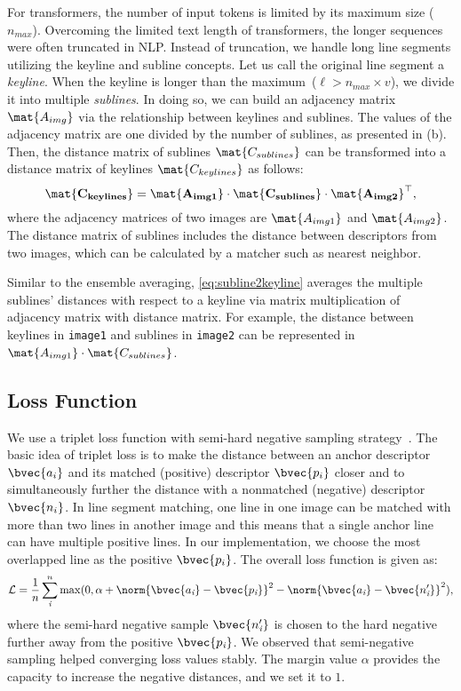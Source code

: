 \documentclass[letterpaper, 10 pt, journal, twoside]{ieeetran}
\begin{document}
For transformers, the number of input tokens is limited by its maximum size ($n_{max}$). Overcoming the limited text length of transformers, the longer sequences were often truncated in NLP.
Instead of truncation, we handle long line segments utilizing the keyline and subline concepts. Let us call the original line segment a \textit{keyline}. When the keyline is longer than the maximum~($\ell > n_{max} \times v$), we divide it into multiple \textit{sublines}. In doing so, we can build an adjacency matrix~$\mat{A_{img}}$ via the relationship between keylines and sublines. The values of the adjacency matrix are one divided by the number of sublines, as presented in (b). Then, the distance matrix of sublines $\mat{C_{sublines}}$ can be transformed into a distance matrix of keylines $\mat{C_{keylines}}$ as follows:
\begin{equation*}
  \label{eq:subline2keyline}
  \mathbf{\mat{C_{keylines}} = \mat{A_{img1}} \cdot \mat{C_{sublines}} \cdot \mat{A_{img2}}^\top},
\end{equation*}
where the adjacency matrices of two images are $\mat{A_{img1}}$ and $\mat{A_{img2}}$. The distance matrix of sublines includes the distance between descriptors from two images, which can be calculated by a matcher such as nearest neighbor.

Similar to the ensemble averaging, \eqref{eq:subline2keyline} averages the multiple sublines' distances with respect to a keyline via matrix multiplication of adjacency matrix with distance matrix. For example, the distance between keylines in \texttt{image1} and sublines in \texttt{image2} can be represented in $\mat{A_{img1}} \cdot \mat{C_{sublines}}$.


\subsection{Loss Function}

We use a triplet loss function with semi-hard negative sampling strategy~\cite{Schroff2015}. The basic idea of triplet loss is to make the distance between an anchor descriptor $\bvec{a_i}$ and its matched (positive) descriptor $\bvec{p_i}$ closer and to simultaneously further the distance with a nonmatched (negative) descriptor $\bvec{n_i}$. In line segment matching, one line in one image can be matched with more than two lines in another image and this means that a single anchor line can have multiple positive lines. In our implementation, we choose the most overlapped line as the positive $\bvec{p_i}$. The overall loss function is given as:
\begin{equation}
	\label{eq:triplet_loss}
	\mathcal{L} = \frac{1}{n}\sum_{\textit{i}}^{n}\max(0, \alpha + \norm{\bvec{a_{\textit{i}}} - \bvec{p_{\textit{i}}}}^2 - \norm{\bvec{a_{\textit{i}}} - \bvec{n'_{\textit{i}}}}^2),
\end{equation}
where the semi-hard negative sample $\bvec{n'_{\textit{i}}}$ is chosen to the hard negative further away from the positive $\bvec{p_{\textit{i}}}$. We observed that semi-negative sampling helped converging loss values stably. The margin value $\alpha$ provides the capacity to increase the negative distances, and we set it to $1$.
\end{document}
